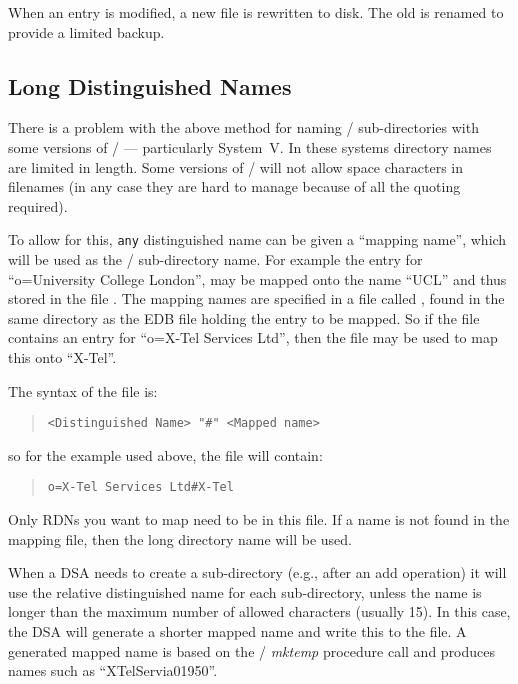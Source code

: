 When an entry is modified, a new  file is rewritten to
disk.  The old  is renamed  to provide
a limited backup.  

\subsection{Long Distinguished Names}
\label{EDB:mapped}
There is a problem with the above method for naming \unix/ sub-directories
with some versions of \unix/ --- particularly System~V.
In these systems directory names are limited in length.
Some versions of \unix/ will not allow space characters in filenames
(in any case they are hard to manage because of all the quoting required).

To allow for this, \verb"any" distinguished name can be given a 
``mapping name'', which will be used as the \unix/ sub-directory name.
For example the entry for ``o=University College London'', may be
mapped onto the name ``UCL'' and thus
stored in the file .
The mapping names are specified in a file called
,
found in the same directory as the
EDB file holding the entry to be mapped.
So if the file  contains an entry for 
``o=X-Tel Services Ltd'', then the file  may be
used to map this onto ``X-Tel''.

The syntax of the  file is:
\begin{quote}\begin{verbatim}
<Distinguished Name> "#" <Mapped name>
\end{verbatim}\end{quote}
so for the example used above, the file will contain:
\begin{quote}\begin{verbatim}
o=X-Tel Services Ltd#X-Tel
\end{verbatim}\end{quote}
Only RDNs you want to map need to be in this file.
If a name is not found in the mapping file, then the long directory name will
be used. 

When a DSA needs to create a sub-directory (e.g., after an add operation)
it will use the relative distinguished name for each sub-directory,
unless the name is longer than the maximum number of allowed
characters (usually 15).  In this case, the DSA will generate a shorter
mapped name and write this to the  file.
A generated mapped name is based on the \unix/ {\em mktemp} procedure
call and produces names such as ``XTelServia01950''.

